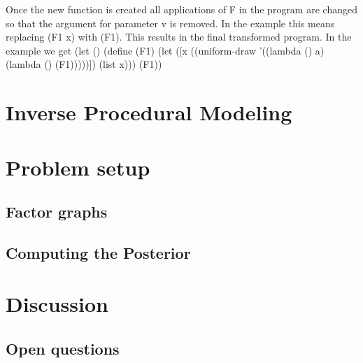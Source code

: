 \documentclass[a4paper,10pt]{article}
\begin{document}
Once the new function is created all applications of F in the program are changed so that the argument for parameter v is removed.  In the example this means replacing (F1 x) with (F1).  This results in the final transformed program.
In the example we get 
(let ()
  (define (F1)
    (let ([x ((uniform-draw '((lambda () a) (lambda () (F1)))))])
      (list x)))
  (F1))
\section{Inverse Procedural Modeling}
\section{Problem setup}
\subsection{Factor graphs}
\subsection{Computing the Posterior}

\section{Discussion}
\subsection{Open questions}



\end{document}
